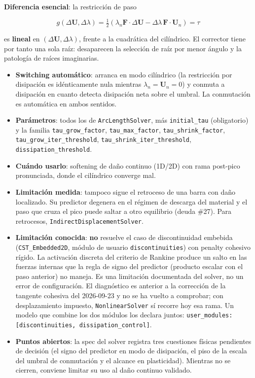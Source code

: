 \documentclass[11pt,oneside]{report}
\begin{document}
\textbf{Diferencia esencial}: la restricción de paso

\[
g(\Delta\mathbf U, \Delta\lambda) = \tfrac{1}{2}\left(\lambda_n \mathbf F \cdot \Delta\mathbf U - \Delta\lambda\, \mathbf F \cdot \mathbf U_n\right) = \tau
\]

es \textbf{lineal} en $(\Delta\mathbf U, \Delta\lambda)$, frente a la cuadrática del cilíndrico. El corrector tiene por tanto una sola raíz: desaparecen la selección de raíz por menor ángulo y la patología de raíces imaginarias.

\begin{itemize}
  \item \textbf{Switching automático}: arranca en modo cilíndrico (la restricción por disipación es idénticamente nula mientras $\lambda_n = \mathbf U_n = 0$) y conmuta a disipación en cuanto detecta disipación neta sobre el umbral. La conmutación es automática en ambos sentidos.
  \item \textbf{Parámetros}: todos los de \texttt{ArcLengthSolver}, más \texttt{initial\_tau} (obligatorio) y la familia \texttt{tau\_grow\_factor}, \texttt{tau\_max\_factor}, \texttt{tau\_\allowbreak{}shrink\_\allowbreak{}factor}, \texttt{tau\_\allowbreak{}grow\_\allowbreak{}iter\_\allowbreak{}threshold}, \texttt{tau\_\allowbreak{}shrink\_\allowbreak{}iter\_\allowbreak{}threshold}, \texttt{dissipation\_\allowbreak{}threshold}.
  \item \textbf{Cuándo usarlo}: softening de daño continuo (1D/2D) con rama post-pico pronunciada, donde el cilíndrico converge mal.
  \item \textbf{Limitación medida}: tampoco sigue el retroceso de una barra con daño localizado. Su predictor degenera en el régimen de descarga del material y el paso que cruza el pico puede saltar a otro equilibrio (deuda \#27). Para retrocesos, \texttt{IndirectDisplacementSolver}.
  \item \textbf{Limitación conocida}: \textbf{no} resuelve el caso de discontinuidad embebida (\texttt{CST\_Embedded2D}, módulo de usuario \texttt{discontinuities}) con penalty cohesivo rígido. La activación discreta del criterio de Rankine produce un salto en las fuerzas internas que la regla de signo del predictor (producto escalar con el paso anterior) no maneja. Es una limitación documentada del solver, no un error de configuración. El diagnóstico es anterior a la corrección de la tangente cohesiva del 2026-09-23 y no se ha vuelto a comprobar; con desplazamiento impuesto, \texttt{NonlinearSolver} sí recorre hoy esa rama. Un modelo que combine los dos módulos los declara juntos: \texttt{user\_\allowbreak{}modules: [discontinuities, dissipation\_\allowbreak{}control]}.
  \item \textbf{Puntos abiertos}: la spec del solver registra tres cuestiones físicas pendientes de decisión (el signo del predictor en modo de disipación, el piso de la escala del umbral de conmutación y el alcance en plasticidad). Mientras no se cierren, conviene limitar su uso al daño continuo validado.
\end{itemize}
\end{document}
